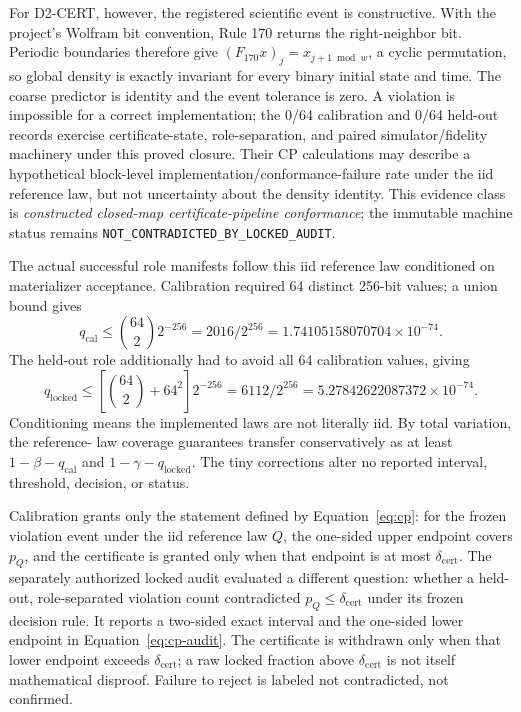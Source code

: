 For D2-CERT, however, the registered scientific event is constructive. With the project's Wolfram
bit convention, Rule 170 returns the right-neighbor bit. Periodic boundaries therefore give
\((F_{170}x)_j=x_{j+1\bmod w}\), a cyclic permutation, so global density is exactly invariant for
every binary initial state and time. The coarse predictor is identity and the event tolerance is
zero. A violation is impossible for a correct implementation; the 0/64 calibration and 0/64
held-out records exercise certificate-state, role-separation, and paired simulator/fidelity
machinery under this proved closure. Their CP calculations may describe a hypothetical block-level
implementation/conformance-failure rate under the iid reference law, but not uncertainty about the
density identity. This evidence class is
\emph{constructed closed-map certificate-pipeline conformance}; the immutable machine
status remains \texttt{NOT\_CONTRADICTED\_BY\_LOCKED\_AUDIT}.

The actual successful role manifests follow this iid reference law conditioned on materializer
acceptance. Calibration required 64 distinct 256-bit values; a union bound gives
\[
q_{\mathrm{cal}}\le {64\choose2}2^{-256}=2016/2^{256}
=1.74105158070704\times10^{-74}.
\]
The held-out role additionally had to avoid all 64 calibration values, giving
\[
q_{\mathrm{locked}}\le\left[{64\choose2}+64^2\right]2^{-256}
=6112/2^{256}=5.27842622087372\times10^{-74}.
\]
Conditioning means the implemented laws are not literally iid. By total variation, the reference-
law coverage guarantees transfer conservatively as at least
\(1-\beta-q_{\mathrm{cal}}\) and \(1-\gamma-q_{\mathrm{locked}}\). The tiny corrections alter no
reported interval, threshold, decision, or status.

Calibration grants only the statement defined by Equation~\eqref{eq:cp}: for the frozen violation
event under the iid reference law \(Q\), the one-sided upper endpoint covers \(p_Q\), and the certificate is
granted only when that endpoint is at most \(\delta_{\mathrm{cert}}\). The separately authorized locked audit
evaluated a different question: whether a held-out, role-separated violation count contradicted
\(p_Q\le\delta_{\mathrm{cert}}\) under its frozen decision rule. It reports a two-sided exact interval and the
one-sided lower endpoint in
Equation~\eqref{eq:cp-audit}. The certificate is withdrawn only when that lower endpoint exceeds
\(\delta_{\mathrm{cert}}\); a raw locked fraction above \(\delta_{\mathrm{cert}}\) is not itself mathematical disproof. Failure to
reject is labeled not contradicted, not confirmed.

